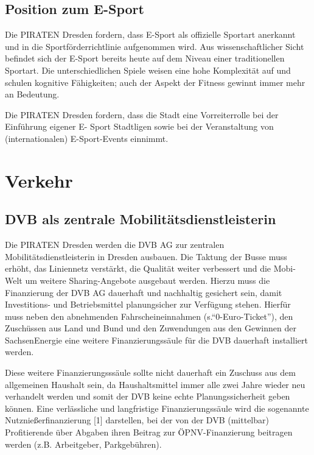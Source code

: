 \documentclass[a4paper, 11pt]{article}
\begin{document}
\subsection{Position zum E-Sport}
Die PIRATEN Dresden fordern, dass E-Sport als offizielle Sportart anerkannt und in die Sportförderrichtlinie aufgenommen wird. Aus wissenschaftlicher Sicht befindet sich der E-Sport bereits heute auf dem Niveau einer traditionellen Sportart. Die unterschiedlichen Spiele weisen eine hohe Komplexität auf und schulen kognitive Fähigkeiten; auch der Aspekt der Fitness gewinnt immer mehr an Bedeutung.\newline

Die PIRATEN Dresden fordern, dass die Stadt eine Vorreiterrolle bei der Einführung eigener E- Sport Stadtligen sowie bei der Veranstaltung von (internationalen) E-Sport-Events einnimmt.


\section{Verkehr}

\subsection{DVB als zentrale Mobilitätsdienstleisterin}
Die PIRATEN Dresden werden die DVB AG zur zentralen Mobilitätsdienstleisterin in Dresden ausbauen. Die Taktung der Busse muss erhöht, das Liniennetz verstärkt, die Qualität weiter verbessert und die Mobi-Welt um weitere Sharing-Angebote ausgebaut werden. Hierzu muss die Finanzierung der DVB AG dauerhaft und nachhaltig gesichert sein, damit Investitions- und Betriebsmittel planungsicher zur Verfügung stehen. Hierfür muss neben den abnehmenden Fahrscheineinnahmen (s.``0-Euro-Ticket''), den Zuschüssen aus Land und Bund und den Zuwendungen aus den Gewinnen der SachsenEnergie eine weitere Finanzierungssäule für die DVB dauerhaft installiert werden.\newline

Diese weitere Finanzierungsssäule sollte nicht dauerhaft ein Zuschuss aus dem allgemeinen Haushalt sein, da Haushaltsmittel immer alle zwei Jahre wieder neu verhandelt werden und somit der DVB keine echte Planungssicherheit geben können. Eine verlässliche und langfristige Finanzierungssäule wird die sogenannte Nutznießerfinanzierung [1] darstellen, bei der von der DVB (mittelbar) Profitierende über Abgaben ihren Beitrag zur ÖPNV-Finanzierung beitragen werden (z.B. Arbeitgeber, Parkgebühren).
\end{document}
